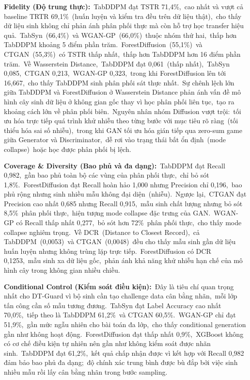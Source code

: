 \textbf{Fidelity (Độ trung thực):}~TabDDPM đạt TSTR 71,4\%,~cao nhất và vượt cả baseline TRTR 69,1\%~(huấn luyện và kiểm tra đều trên dữ liệu thật),~cho thấy dữ liệu sinh không chỉ phản ánh phân phối thực mà còn hỗ trợ học transfer hiệu quả.~TabSyn~(66,4\%)~và WGAN-GP~(66,0\%)~thuộc nhóm thứ hai,~thấp hơn TabDDPM khoảng 5 điểm phần trăm.~ForestDiffusion~(55,1\%)~và CTGAN~(55,3\%)~có TSTR thấp nhất,~thấp hơn TabDDPM hơn 16 điểm phần trăm.~Về Wasserstein Distance,~TabDDPM đạt 0,061~(thấp nhất),~TabSyn 0,085,~CTGAN 0,213,~WGAN-GP 0,323,~trong khi ForestDiffusion lên tới 16,667,~cho thấy TabDDPM sinh phân phối sát thực nhất.~Sự chênh lệch lớn giữa TabDDPM và ForestDiffusion ở Wasserstein Distance phản ánh vấn đề mô hình cây sinh dữ liệu ở không gian gốc thay vì học phân phối liên tục,~tạo ra khoảng cách lớn về phân phối biên.~Nguyên nhân nhóm Diffusion vượt trội:~tối ưu hóa trực tiếp quá trình khử nhiễu theo từng bước với mục tiêu rõ ràng~(tối thiểu hóa sai số nhiễu),~trong khi GAN tối ưu hóa gián tiếp qua zero-sum game giữa Generator và Discriminator,~dễ rơi vào trạng thái bất ổn định~(mode collapse)~hoặc học được phân phối bị lệch.

\textbf{Coverage \& Diversity (Bao phủ và đa dạng):}~TabDDPM đạt Recall 0,982,~gần bao phủ toàn bộ các vùng của phân phối thực,~chỉ bỏ sót 1,8\%.~ForestDiffusion đạt Recall hoàn hảo 1,000 nhưng Precision chỉ 0,196,~bao phủ rộng nhưng sinh nhiều mẫu không đại diện~(nhiễu).~Ngược lại,~CTGAN đạt Precision cao nhất 0,685 nhưng Recall 0,915,~mẫu sinh chất lượng nhưng bỏ sót 8,5\%~phân phối thực,~hiện tượng mode collapse đặc trưng của GAN.~WGAN-GP có Recall thấp nhất 0,277,~bỏ sót hơn 72\%~phân phối thực,~cho thấy mode collapse nghiêm trọng.~Về DCR~(Distance to Closest Record),~cả TabDDPM~(0,0053)~và CTGAN~(0,0048)~đều cho thấy mẫu sinh gần dữ liệu huấn luyện nhưng không trùng lặp trực tiếp.~ForestDiffusion có DCR 0,1253,~mẫu sinh xa dữ liệu gốc,~phản ánh khả năng khử nhiễu hạn chế của mô hình cây trong không gian nhiều chiều.

\textbf{Conditional Control (Kiểm soát điều kiện):}~Đây là tiêu chí quan trọng nhất cho DT-Guard vì bộ sinh cần tạo challenge data cân bằng nhãn,~mỗi lớp tấn công cần số mẫu tương đương.~TabSyn đạt Label Accuracy cao nhất 70,0\%,~tiếp theo là TabDDPM 61,2\%~và CTGAN 60,5\%.~WGAN-GP chỉ đạt 51,9\%,~gần mức ngẫu nhiên cho bài toán đa lớp,~cho thấy conditional generation gần như không hoạt động.~ForestDiffusion đạt thấp nhất 0,9\%,~XGBoost không có cơ chế điều kiện tự nhiên nên gần như không kiểm soát được nhãn sinh.~TabDDPM đạt 61,2\%,~kết quả chấp nhận được vì kết hợp với Recall 0,982 đảm bảo bao phủ đa dạng;~độ chính xác trung bình được bù đắp bởi việc sinh nhiều mẫu rồi lấy cân bằng nhãn trong bước sampling.

